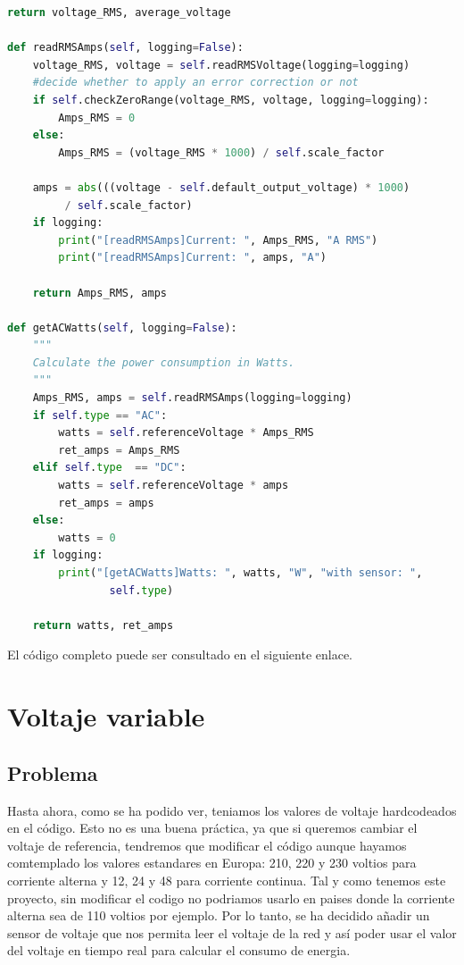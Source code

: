 \begin{titlepage}
\begin{lstlisting}[language=python]
	return voltage_RMS, average_voltage

def readRMSAmps(self, logging=False):
	voltage_RMS, voltage = self.readRMSVoltage(logging=logging)
	#decide whether to apply an error correction or not
	if self.checkZeroRange(voltage_RMS, voltage, logging=logging):
		Amps_RMS = 0
	else:
		Amps_RMS = (voltage_RMS * 1000) / self.scale_factor

	amps = abs(((voltage - self.default_output_voltage) * 1000)
		 / self.scale_factor)
	if logging:
		print("[readRMSAmps]Current: ", Amps_RMS, "A RMS")
		print("[readRMSAmps]Current: ", amps, "A")

	return Amps_RMS, amps

def getACWatts(self, logging=False):
	"""
	Calculate the power consumption in Watts.
	"""
	Amps_RMS, amps = self.readRMSAmps(logging=logging)
	if self.type == "AC":
		watts = self.referenceVoltage * Amps_RMS
		ret_amps = Amps_RMS
	elif self.type  == "DC":
		watts = self.referenceVoltage * amps
		ret_amps = amps
	else:
		watts = 0
	if logging:
		print("[getACWatts]Watts: ", watts, "W", "with sensor: ", 
				self.type)

	return watts, ret_amps

\end{lstlisting}

El código completo puede ser consultado en el siguiente enlace\cite{ref23}.\\


\section {Voltaje variable}
\subsection{Problema}
Hasta ahora, como se ha podido ver, teniamos los valores de voltaje hardcodeados en el código. Esto no es una buena práctica, ya que si queremos cambiar el voltaje de referencia, tendremos que modificar el código aunque hayamos comtemplado los valores estandares en Europa: 210, 220 y 230 voltios para corriente alterna y 12, 24 y 48 para corriente continua. Tal y como tenemos este proyecto, sin modificar el codigo no podriamos usarlo en paises donde la corriente alterna sea de 110 voltios por ejemplo. Por lo tanto, se ha decidido añadir un sensor de voltaje que nos permita leer el voltaje de la red y así poder usar el valor del voltaje en tiempo real para calcular el consumo de energia.\\


\end{titlepage}
